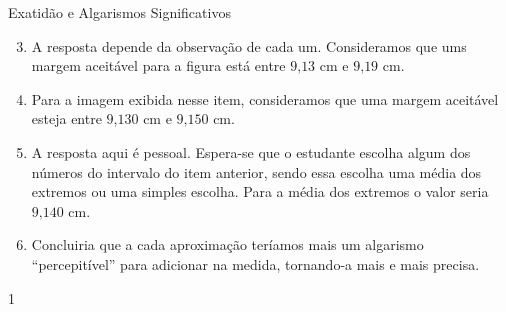 \clearmargin
\begin{answer}{Exatidão e Algarismos Significativos}
{
\begin{enumerate}\setcounter{enumi}{2}
\item A resposta depende da observação de cada um. Consideramos que ums margem aceitável para a figura está entre \(9\text{,}13\) cm e \(9\text{,}19\) cm.

\item {} 
Para a imagem exibida nesse item, consideramos que uma margem aceitável esteja entre \(9\text{,}130\) cm e \(9\text{,}150\) cm.

\item {} 
A resposta aqui é pessoal. Espera-se que o estudante escolha algum dos números do intervalo do item anterior, sendo essa escolha uma média dos extremos ou uma simples escolha. Para a média dos extremos o valor seria \(9\text{,}140\) cm.

\item {} 
Concluiria que a cada aproximação teríamos mais um algarismo “percepitível” para adicionar na medida, tornando-a mais e mais precisa.
\end{enumerate}
}{1}
\end{answer}

